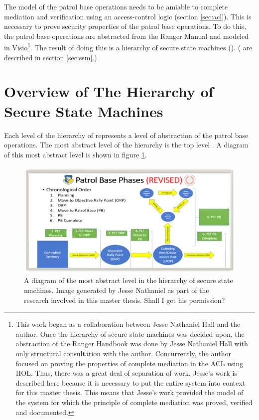 \documentclass[../../main/main.tex]{subfiles}
\begin{document}
The model of the patrol base operations needs to be amiable to complete mediation and verification using an access-control logic (section \ref{sec:acl}).  This is necessary to prove security properties of the patrol base operations.  To do this, the patrol base operations are abstracted from the Ranger Manual and modeled in Visio\footnote{This work began as a collaboration between Jesse Nathaniel Hall and the author.  Once the hierarchy of secure state machines was decided upon, the abstraction of the Ranger Handbook was done by Jesse Nathaniel Hall with only structural consultation with the author.  Concurrently, the author focused on proving the properties of complete mediation in the ACL using HOL.  Thus, there was a great deal of separation of work.  Jesse's work is described here because it is necessary to put the entire system into context for this master thesis.  This means that Jesse's work provided the model of the system for which the principle of complete mediation was proved, verified and documented.}.  The result of doing this is a hierarchy of secure state machines (). ( are described in section \ref{sec:ssm}.)  

\section{Overview of The Hierarchy of Secure State Machines}\label{sec:overview}

Each level of the hierarchy of  represents a level of abstraction of the patrol base operations. The most abstract level of the hierarchy is the top level .  A diagram of this most abstract level is shown in figure \ref{pbtoplevel}.

\begin{figure}[h]
\includegraphics[width=\textwidth]{../figures/pbtoplevel}
\caption{\label{pbtoplevel}A diagram of the most abstract level in the hierarchy of secure state machines.  Image generated by Jesse Nathaniel as part of the research involved in this master thesis.  Shall I get his permission?}
\end{figure}
\end{document}
